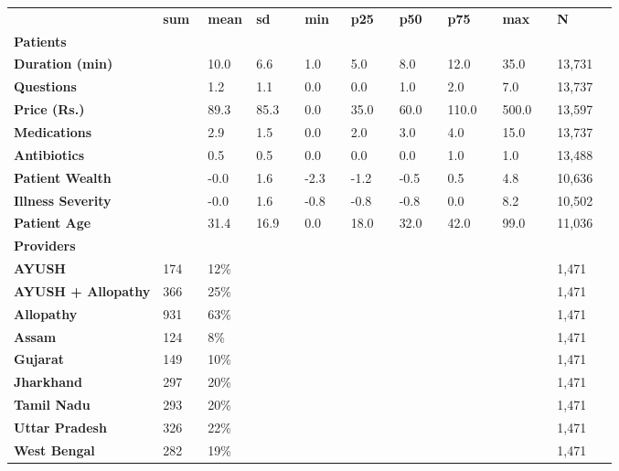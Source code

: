 \begin{longtable}[]{@{}llllllllll@{}}
\toprule
\endhead
\textbf{~} & \textbf{sum} & \textbf{mean} & \textbf{sd} & \textbf{min} &
\textbf{p25} & \textbf{p50} & \textbf{p75} & \textbf{max} &
\textbf{N}\tabularnewline
\textbf{Patients} & & & & & & & & &\tabularnewline
\textbf{Duration (min)} & & 10.0~~ & 6.6~~ & 1.0~~ & 5.0~~ & 8.0~~ &
12.0~~ & 35.0~~ & 13,731~~\tabularnewline
\textbf{Questions} & & 1.2~~ & 1.1~~ & 0.0~~ & 0.0~~ & 1.0~~ & 2.0~~ &
7.0~~ & 13,737~~\tabularnewline
\textbf{Price (Rs.)} & & 89.3~~ & 85.3~~ & 0.0~~ & 35.0~~ & 60.0~~ &
110.0~~ & 500.0~~ & 13,597~~\tabularnewline
\textbf{Medications} & & 2.9~~ & 1.5~~ & 0.0~~ & 2.0~~ & 3.0~~ & 4.0~~ &
15.0~~ & 13,737~~\tabularnewline
\textbf{Antibiotics} & & 0.5~~ & 0.5~~ & 0.0~~ & 0.0~~ & 0.0~~ & 1.0~~ &
1.0~~ & 13,488~~\tabularnewline
\textbf{Patient Wealth} & & -0.0~~ & 1.6~~ & -2.3~~ & -1.2~~ & -0.5~~ &
0.5~~ & 4.8~~ & 10,636~~\tabularnewline
\textbf{Illness Severity} & & -0.0~~ & 1.6~~ & -0.8~~ & -0.8~~ & -0.8~~
& 0.0~~ & 8.2~~ & 10,502~~\tabularnewline
\textbf{Patient Age} & & 31.4~~ & 16.9~~ & 0.0~~ & 18.0~~ & 32.0~~ &
42.0~~ & 99.0~~ & 11,036~~\tabularnewline
\textbf{Providers} & & & & & & & & &\tabularnewline
\textbf{AYUSH} & 174~~ & 12\% & & & & & & & 1,471~~\tabularnewline
\textbf{AYUSH + Allopathy} & 366~~ & 25\% & & & & & & &
1,471~~\tabularnewline
\textbf{Allopathy} & 931~~ & 63\% & & & & & & & 1,471~~\tabularnewline
\textbf{Assam} & 124~~ & 8\% & & & & & & & 1,471~~\tabularnewline
\textbf{Gujarat} & 149~~ & 10\% & & & & & & & 1,471~~\tabularnewline
\textbf{Jharkhand} & 297~~ & 20\% & & & & & & & 1,471~~\tabularnewline
\textbf{Tamil Nadu} & 293~~ & 20\% & & & & & & & 1,471~~\tabularnewline
\textbf{Uttar Pradesh} & 326~~ & 22\% & & & & & & &
1,471~~\tabularnewline
\textbf{West Bengal} & 282~~ & 19\% & ~ & ~ & ~ & ~ & ~ & ~ &
1,471~~\tabularnewline
\bottomrule
\end{longtable}
